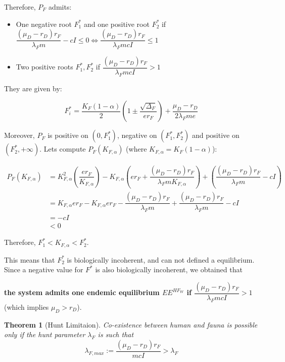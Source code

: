 \documentclass{article}
\newcommand{\lfw}{\lambda_{F}}
\newcommand{\lfw}{\lambda_{F}}
\newtheorem{theorem}{Theorem}
\begin{document}
Therefore, $P_F$ admits:
\begin{itemize}
\item One negative root $F^*_1$ and one positive root $F^*_2$ if $\dfrac{(\mu_D - r_D) r_F}{\lfw m} - cI \leq 0 \Leftrightarrow \dfrac{(\mu_D - r_D) r_F}{\lfw m cI} \leq 1$
\item Two positive roots $F^*_1, F^*_2$ if $\dfrac{(\mu_D - r_D) r_F}{\lfw m cI} > 1$
\end{itemize}
They are given by:

\begin{equation*}
F_i^* = \dfrac{K_F(1-\alpha)}{2}\left(1 \pm \dfrac{\sqrt{\Delta_F}}{er_F}\right) + \dfrac{\mu_D - r_D}{2\lfw m e}
\end{equation*}

Moreover, $P_F$ is positive on $(0, F_1^*)$, negative on $(F^*_1, F^*_2)$ and positive on $(F^*_2, +\infty)$. Lets compute $P_F(K_{F,\alpha})$ (where $ K_{F,\alpha} = K_F(1-\alpha)$):



\begin{align*}
P_F(K_{F,\alpha}) &= K_{F,\alpha}^2 \left(\dfrac{er_F}{K_{F,\alpha}} \right) - K_{F,\alpha} \left(er_F + \dfrac{(\mu_D - r_D) r_F}{\lfw m K_{F,\alpha}} \right) + \left(\dfrac{(\mu_D - r_D) r_F}{\lfw m} - cI \right) \\
&= K_{F,\alpha}er_F - K_{F,\alpha}er_F - \dfrac{(\mu_D - r_D) r_F}{\lfw m} + \dfrac{(\mu_D - r_D) r_F}{\lfw m} - cI \\
&= -cI\\
& < 0
\end{align*}

Therefore, $F_1^* < K_{F, \alpha} < F_2^*$. 

This means that $F_2^*$ is biologically incoherent, and can not defined a equilibrium. Since a negative value for $F^*$ is also biologically incoherent, we obtained that

\textbf{the system admits one endemic equilibrium $EE^{HF_W}$ if $\dfrac{(\mu_D - r_D) r_F}{\lfw m cI} > 1$} (which implies $\mu_D > r_D$).

\begin{theorem}[Hunt Limitaion]
Co-existence between human and fauna is possible only if the hunt parameter $\lfw$ is such that
$$
\lambda_{F, max} := \dfrac{(\mu_D - r_D) r_F}{m cI} > \lfw
$$

\end{theorem}
\end{document}
